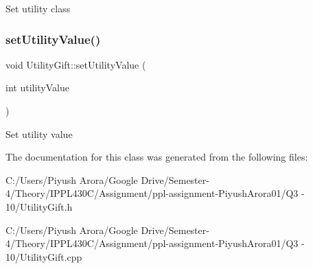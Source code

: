 Set utility class \mbox{\label{class_utility_gift_a7dbd7e650be49d1f4e28b16b9a78a4c7}} 
\subsubsection{\texorpdfstring{set\+Utility\+Value()}{setUtilityValue()}}
{\footnotesize\ttfamily void Utility\+Gift\+::set\+Utility\+Value (\begin{DoxyParamCaption}\item[{int}]{utility\+Value }\end{DoxyParamCaption})}

Set utility value 

The documentation for this class was generated from the following files\+:\begin{DoxyCompactItemize}
\item 
C\+:/\+Users/\+Piyush Arora/\+Google Drive/\+Semester-\/4/\+Theory/\+I\+P\+P\+L430\+C/\+Assignment/ppl-\/assignment-\/\+Piyush\+Arora01/\+Q3 -\/ 10/Utility\+Gift.\+h\item 
C\+:/\+Users/\+Piyush Arora/\+Google Drive/\+Semester-\/4/\+Theory/\+I\+P\+P\+L430\+C/\+Assignment/ppl-\/assignment-\/\+Piyush\+Arora01/\+Q3 -\/ 10/Utility\+Gift.\+cpp\end{DoxyCompactItemize}
